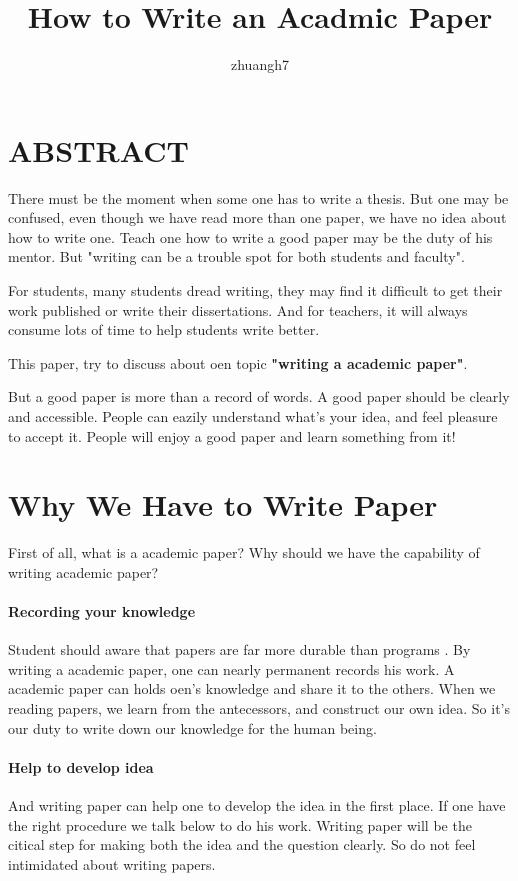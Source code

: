 \documentclass{article}
\author{zhuangh7}
\title{How to Write an Acadmic Paper}
\begin{document}
\maketitle
\tableofcontents
\section{ABSTRACT}
There must be the moment when some one has to write a thesis.
But one may be confused, even though we have read more than one paper, 
we have no idea about how to write one.
Teach one how to write a good paper may be the duty of his mentor.
But "writing can be a trouble spot for both students and faculty"\cite{LearnIn2Hours}.

For students, many students dread writing, they may find it difficult to get their work published 
or write their dissertations.
And for teachers, it will always consume lots of time to help students write better.

This paper, try to discuss about oen topic \textbf{"writing a academic paper"}.



But a good paper is more than a record of words.
A good paper should be clearly and accessible.
People can eazily understand what's your idea, 
and feel pleasure to accept it.
People will enjoy a good paper and learn something from it! \cite{PeopleCanRead}


\section{Why We Have to Write Paper}
First of all, what is a academic paper? 
Why should we have the capability of writing academic paper?

\paragraph{Recording your knowledge}
Student should aware that papers are far more durable than programs \cite{AGreatResearchPaper}.
By writing a academic paper, one can nearly permanent records his work.
A academic paper can holds oen's knowledge and share it to the others.
When we reading papers, we learn from the antecessors, and construct our own idea.
So it's our duty to write down our knowledge for the human being.

\paragraph{Help to develop idea}
And writing paper can help one to develop the idea in the first place.
If one have the right procedure we talk below to do his work.
Writing paper will be the citical step for making both the idea and the question clearly.
So do not feel intimidated about writing papers.
\end{document}
